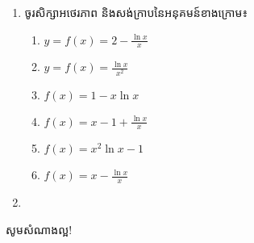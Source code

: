 \documentclass[12pt, a4paper]{article}
\begin{document}
\maketitle
\begin{enumerate}[m]
	\item ចូរសិក្សាអថេរភាព និងសង់ក្រាបនៃអនុគមន៍ខាងក្រោម៖
	\begin{enumerate}[k,3]
		\item $y=f(x)=2-\frac{\ln x}{x}$
		\item $y=f(x)=\frac{\ln x}{x^2}$
		\item $f(x)=1-x\ln x$
		\item $f(x)=x-1+\frac{\ln x}{x}$
		\item $f(x)=x^2\ln x-1$
		\item $f(x)=x-\frac{\ln x}{x}$
	\end{enumerate}
	\item 
\end{enumerate}
	\begin{center}
		\sffamily\color{black}
		សូមសំណាងល្អ!
	\end{center}\newpage
\end{document}
